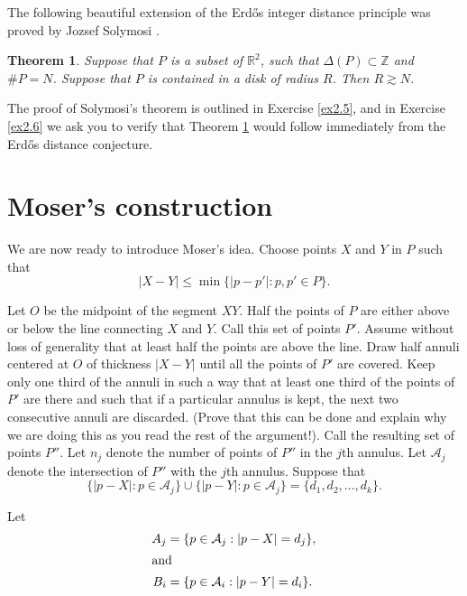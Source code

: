 \documentclass[]{stml-l}
\numberwithin{equation}{chapter}
\theoremstyle{plain}
\newtheorem{theorem}[equation]{Theorem}
\theoremstyle{definition}
\theoremstyle{remark}
\begin{document}
The following beautiful extension of the Erd\H{o}s integer distance
principle was proved by Jozsef Solymosi \cite{Soly}.

\begin{theorem} \label{soly.thm}
Suppose that $P$ is a subset of $\mathbb{R}^2$, such that $\Delta(P)
\subset \mathbb{Z}$ and $\# P=N$. Suppose that $P$ is contained in a
disk of radius $R$. Then $R \gtrsim N$. \end{theorem}

The proof of Solymosi's theorem is outlined in Exercise \ref{ex2.5}, and
in Exercise \ref{ex2.6} we ask you to verify that Theorem \ref{soly.thm} would follow
immediately from the Erd\H{o}s distance conjecture.

\section{Moser's construction}

We are now ready to introduce Moser's idea. Choose points $X$ and
$Y$ in $P$ such that
\begin{equation}
|X-Y| \leq \min \{|p-p'|: p,p' \in P\}.
\end{equation}


Let $O$ be the midpoint of the segment $XY$. Half the points of
$P$ are either above or below the line connecting $X$ and $Y$.
Call this set of points $P'$. Assume without loss of generality
that at least half the points are above the line. Draw half annuli
centered at $O$ of thickness $|X-Y|$ until all the points of $P'$
are covered. Keep only one third of the annuli in such a way that
at least one third of the points of $P'$ are there and such that
if a particular annulus is kept, the next two consecutive annuli
are discarded. (Prove that this can be done and explain why we are
doing this as you read the rest of the argument!). Call the
resulting set of points $P''$. Let $n_j$ denote the number of
points of $P''$ in the $j$th annulus. Let $\mathcal{A}_j$ denote the
intersection of $P''$ with the $j$th annulus. Suppose that
\begin{equation}
\{|p-X|: p \in \mathcal{A}_j\} \cup \{|p-Y|: p \in
\mathcal{A}_j\}=\{d_1,d_2, \dots, d_k\}.
\end{equation}


Let
\begin{align}
A_j&=\{p \in \mathcal{A}_j: |p-X|=d_j\}, \\ \intertext{and}
 B_i&=\{p \in \mathcal{A}_i: |p-Y|=d_i\}.
\end{align}
\end{document}
